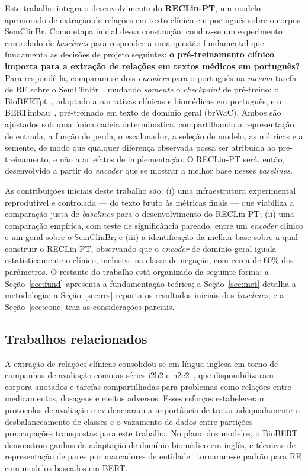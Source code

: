 \documentclass[12pt]{article}
\begin{document}
Este trabalho integra o desenvolvimento do \textbf{RECLin-PT}, um modelo
aprimorado de extração de relações em texto clínico em português sobre o corpus
SemClinBr. Como etapa inicial dessa construção, conduz-se um experimento
controlado de \emph{baselines} para responder a uma questão fundamental que
fundamenta as decisões de projeto seguintes: \textbf{o pré-treinamento clínico
importa para a extração de relações em textos médicos em português?} Para
respondê-la, comparam-se dois \emph{encoders} para o português na \emph{mesma}
tarefa de RE sobre o SemClinBr~\cite{oliveira:22}, mudando \emph{somente} o
\emph{checkpoint} de pré-treino: o BioBERTpt~\cite{schneider:20}, adaptado a
narrativas clínicas e biomédicas em português, e o BERTimbau~\cite{souza:20},
pré-treinado em texto de domínio geral (brWaC). Ambos são ajustados sob uma única
cadeia determinística, compartilhando a representação de entrada, a função de
perda, o escalonador, a seleção de modelo, as métricas e a semente, de modo que
qualquer diferença observada possa ser atribuída ao pré-treinamento, e não a
artefatos de implementação. O RECLin-PT será, então, desenvolvido a partir do
\emph{encoder} que se mostrar a melhor base nesses \emph{baselines}.

As contribuições iniciais deste trabalho são: (i) uma infraestrutura
experimental reprodutível e controlada --- do texto bruto às métricas finais ---
que viabiliza a comparação justa de \emph{baselines} para o desenvolvimento do
RECLin-PT; (ii) uma comparação empírica, com teste de significância pareado,
entre um \emph{encoder} clínico e um geral sobre o SemClinBr; e (iii) a
identificação da melhor base sobre a qual construir o RECLin-PT, observando que o
\emph{encoder} de domínio geral iguala estatisticamente o clínico, inclusive na
classe de negação, com cerca de 60\% dos parâmetros. O restante do trabalho está
organizado da seguinte forma: a Seção~\ref{sec:fund} apresenta a fundamentação
teórica; a Seção~\ref{sec:met} detalha a metodologia; a Seção~\ref{sec:res}
reporta os resultados iniciais dos \emph{baselines}; e a
Seção~\ref{sec:conc} traz as considerações parciais.

\subsection{Trabalhos relacionados}
A extração de relações clínicas consolidou-se em língua inglesa em torno de
campanhas de avaliação como as séries i2b2 e n2c2~\cite{uzuner:11}, que
disponibilizaram corpora anotados e tarefas compartilhadas para problemas como
relações entre medicamentos, dosagens e efeitos adversos. Esses esforços
estabeleceram protocolos de avaliação e evidenciaram a importância de tratar
adequadamente o desbalanceamento de classes e o vazamento de dados entre
partições --- preocupações transpostas para este trabalho. No plano dos modelos,
o BioBERT~\cite{lee:20} demonstrou ganhos da adaptação de domínio biomédico em
inglês, e técnicas de representação de pares por marcadores de
entidade~\cite{soares:19} tornaram-se padrão para RE com modelos baseados em
BERT.
\end{document}
